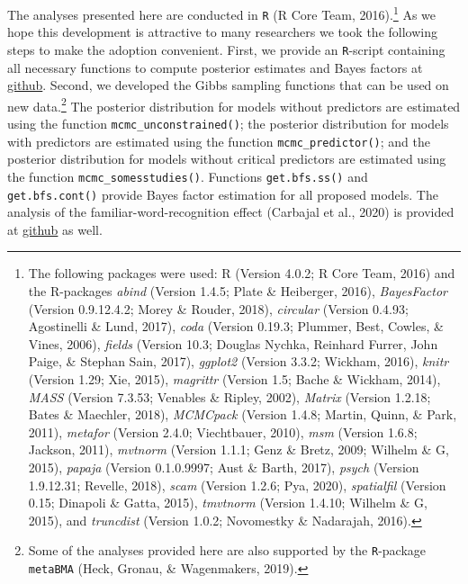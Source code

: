 \documentclass[english,,man]{apa6}
\begin{document}
The analyses presented here are conducted in \texttt{R} (R Core Team, 2016).\footnote{The following packages were used: R (Version 4.0.2; R Core Team, 2016) and the R-packages \emph{abind} (Version 1.4.5; Plate \& Heiberger, 2016), \emph{BayesFactor} (Version 0.9.12.4.2; Morey \& Rouder, 2018), \emph{circular} (Version 0.4.93; Agostinelli \& Lund, 2017), \emph{coda} (Version 0.19.3; Plummer, Best, Cowles, \& Vines, 2006), \emph{fields} (Version 10.3; Douglas Nychka, Reinhard Furrer, John Paige, \& Stephan Sain, 2017), \emph{ggplot2} (Version 3.3.2; Wickham, 2016), \emph{knitr} (Version 1.29; Xie, 2015), \emph{magrittr} (Version 1.5; Bache \& Wickham, 2014), \emph{MASS} (Version 7.3.53; Venables \& Ripley, 2002), \emph{Matrix} (Version 1.2.18; Bates \& Maechler, 2018), \emph{MCMCpack} (Version 1.4.8; Martin, Quinn, \& Park, 2011), \emph{metafor} (Version 2.4.0; Viechtbauer, 2010), \emph{msm} (Version 1.6.8; Jackson, 2011), \emph{mvtnorm} (Version 1.1.1; Genz \& Bretz, 2009; Wilhelm \& G, 2015), \emph{papaja} (Version 0.1.0.9997; Aust \& Barth, 2017), \emph{psych} (Version 1.9.12.31; Revelle, 2018), \emph{scam} (Version 1.2.6; Pya, 2020), \emph{spatialfil} (Version 0.15; Dinapoli \& Gatta, 2015), \emph{tmvtnorm} (Version 1.4.10; Wilhelm \& G, 2015), and \emph{truncdist} (Version 1.0.2; Novomestky \& Nadarajah, 2016).} As we hope this development is attractive to many researchers we took the following steps to make the adoption convenient. First, we provide an \texttt{R}-script containing all necessary functions to compute posterior estimates and Bayes factors at \href{https://github.com/jstbcs/meta-poor/blob/public/share/lib.R}{github}. Second, we developed the Gibbs sampling functions that can be used on new data.\footnote{Some of the analyses provided here are also supported by the \texttt{R}-package \texttt{metaBMA} (Heck, Gronau, \& Wagenmakers, 2019).} The posterior distribution for models without predictors are estimated using the function \texttt{mcmc\_unconstrained()}; the posterior distribution for models with predictors are estimated using the function \texttt{mcmc\_predictor()}; and the posterior distribution for models without critical predictors are estimated using the function \texttt{mcmc\_somesstudies()}. Functions \texttt{get.bfs.ss()} and \texttt{get.bfs.cont()} provide Bayes factor estimation for all proposed models. The analysis of the familiar-word-recognition effect (Carbajal et al., 2020) is provided at \href{https://github.com/jstbcs/meta-poor/blob/public/papers/submission/analysis/analysis_carbajal.Rmd}{github} as well.
\end{document}
